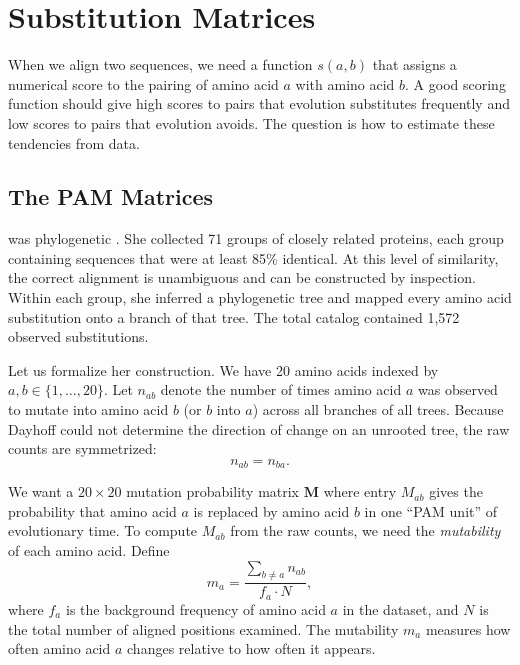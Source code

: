 \section{Substitution Matrices}
\label{sec:substitution-matrices}

When we align two sequences, we need a function $s(a,b)$ that assigns a numerical score to the pairing of amino acid $a$ with amino acid $b$. A good scoring function should give high scores to pairs that evolution substitutes frequently and low scores to pairs that evolution avoids. The question is how to estimate these tendencies from data.

\subsection{The PAM Matrices}
\label{sec:pam}

 was phylogenetic \cite{dayhoff1978}. She collected 71 groups of closely related proteins, each group containing sequences that were at least 85\% identical. At this level of similarity, the correct alignment is unambiguous and can be constructed by inspection. Within each group, she inferred a phylogenetic tree and mapped every amino acid substitution onto a branch of that tree. The total catalog contained 1,572 observed substitutions.

Let us formalize her construction. We have 20 amino acids indexed by $a, b \in \{1, \ldots, 20\}$. Let $n_{ab}$ denote the number of times amino acid $a$ was observed to mutate into amino acid $b$ (or $b$ into $a$) across all branches of all trees. Because Dayhoff could not determine the direction of change on an unrooted tree, the raw counts are symmetrized:
\begin{equation}
  \label{eq:pam-raw-counts}
  n_{ab} = n_{ba}.
\end{equation}

We want a $20 \times 20$ mutation probability matrix $\mathbf{M}$ where entry $M_{ab}$ gives the probability that amino acid $a$ is replaced by amino acid $b$ in one ``PAM unit'' of evolutionary time. To compute $M_{ab}$ from the raw counts, we need the \emph{mutability} of each amino acid. Define
\begin{equation}
  \label{eq:mutability}
  m_a = \frac{\sum_{b \neq a} n_{ab}}{f_a \cdot N},
\end{equation}
where $f_a$ is the background frequency of amino acid $a$ in the dataset, and $N$ is the total number of aligned positions examined. The mutability $m_a$ measures how often amino acid $a$ changes relative to how often it appears.

